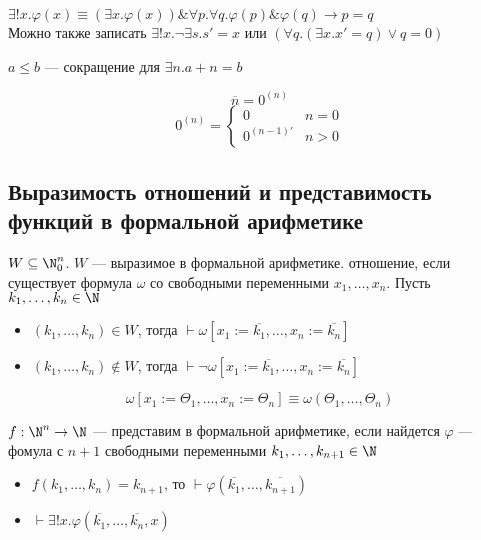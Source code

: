 \documentclass[english]{article}
\begin{document}
\begin{definition}
	\(\exists! x.\varphi(x) \equiv (\exists x. \varphi(x))\&\forall p.\forall q. \varphi(p)\&\varphi(q) \to p = q\) \\
	Можно также записать \(\exists ! x.\neg \exists s. s' = x\) или \((\forall q.(\exists x. x' = q)\vee q= 0)\)
\end{definition}
\begin{definition}
	\(a \le b\) --- сокращение для \(\exists n. a + n = b\)
\end{definition}
\begin{definition}
	\[ \overline{n} = 0^{(n)}\]
	\[ 0^{(n)} = \begin{cases}
			0            & n = 0 \\
			0^{(n - 1)'} & n > 0
		\end{cases}\]
\end{definition}
\subsection{Выразимость отношений и представимость функций в формальной арифметике}
\label{sec:orgedd3b0e}
\begin{definition}
	\(W \subseteq \N_0^n\). \(W\) --- выразимое в формальной арифметике. отношение, если существует формула \(\omega\) со свободными переменными \(x_1,\dots,x_n\). Пусть \(k_1,\dots,k_n \in \N\)
	\begin{itemize}
		\item \((k_1,\dots,k_n) \in W\), тогда \(\vdash \omega[x_1:=\overline{k_1}, \dots, x_n := \overline{k_n}]\)
		\item \((k_1,\dots,k_n) \not\in W\), тогда \(\vdash \neg \omega[x_1:=\overline{k_1},\dots,x_n:=\overline{k_n}]\)
	\end{itemize}
	\[ \omega[x_1:=\Theta_1,\dots,x_n:=\Theta_n] \equiv \omega(\Theta_1, \dots, \Theta_n) \]
	\label{orgbef1612}
\end{definition}
\begin{definition}
	\(f: \N^n \to \N\) --- представим в формальной арифметике, если найдется \(\varphi\) --- фомула с \(n + 1\) свободными переменными \(k_1, \dots, k_{n + 1} \in \N\)
	\begin{itemize}
		\item \(f(k_1,\dots,k_n) = k_{n + 1}\), то \(\vdash \varphi(\overline{k_1},\dots,\overline{k_{n + 1}})\) \\
		\item \(\vdash \exists! x.\varphi(\overline{k_1},\dots,\overline{k_n},x)\)
	\end{itemize}
	\label{orgf5100eb}
\end{definition}
\end{document}
